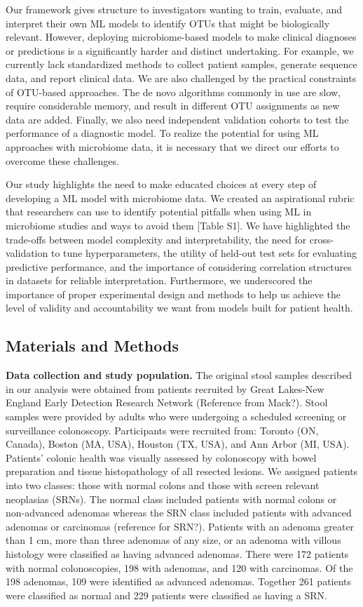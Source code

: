 \documentclass[11pt,]{article}
\begin{document}
Our framework gives structure to investigators wanting to train,
evaluate, and interpret their own ML models to identify OTUs that might
be biologically relevant. However, deploying microbiome-based models to
make clinical diagnoses or predictions is a significantly harder and
distinct undertaking. For example, we currently lack standardized
methods to collect patient samples, generate sequence data, and report
clinical data. We are also challenged by the practical constraints of
OTU-based approaches. The de novo algorithms commonly in use are slow,
require considerable memory, and result in different OTU assignments as
new data are added. Finally, we also need independent validation cohorts
to test the performance of a diagnostic model. To realize the potential
for using ML approaches with microbiome data, it is necessary that we
direct our efforts to overcome these challenges.

Our study highlights the need to make educated choices at every step of
developing a ML model with microbiome data. We created an aspirational
rubric that researchers can use to identify potential pitfalls when
using ML in microbiome studies and ways to avoid them {[}Table S1{]}. We
have highlighted the trade-offs between model complexity and
interpretability, the need for cross-validation to tune hyperparameters,
the utility of held-out test sets for evaluating predictive performance,
and the importance of considering correlation structures in datasets for
reliable interpretation. Furthermore, we underscored the importance of
proper experimental design and methods to help us achieve the level of
validity and accountability we want from models built for patient
health.

\subsection{Materials and Methods}\label{materials-and-methods}

\textbf{Data collection and study population.} The original stool
samples described in our analysis were obtained from patients recruited
by Great Lakes-New England Early Detection Research Network (Reference
from Mack?). Stool samples were provided by adults who were undergoing a
scheduled screening or surveillance colonoscopy. Participants were
recruited from: Toronto (ON, Canada), Boston (MA, USA), Houston (TX,
USA), and Ann Arbor (MI, USA). Patients' colonic health was visually
assessed by colonoscopy with bowel preparation and tissue histopathology
of all resected lesions. We assigned patients into two classes: those
with normal colons and those with screen relevant neoplasias (SRNs). The
normal class included patients with normal colons or non-advanced
adenomas whereas the SRN class included patients with advanced adenomas
or carcinomas (reference for SRN?). Patients with an adenoma greater
than 1 cm, more than three adenomas of any size, or an adenoma with
villous histology were classified as having advanced adenomas. There
were 172 patients with normal colonoscopies, 198 with adenomas, and 120
with carcinomas. Of the 198 adenomas, 109 were identified as advanced
adenomas. Together 261 patients were classified as normal and 229
patients were classified as having a SRN.
\end{document}
